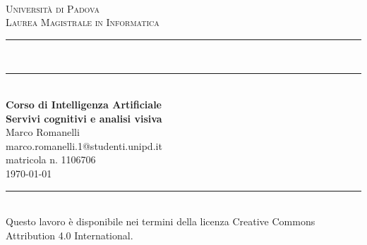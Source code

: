\documentclass[fleqn,a4paper,11pt]{article}
\newcommand\HRule{\rule{\textwidth}{1pt}}
\newcommand\DRule{\rule{\textwidth}{.4pt}\\[\dimexpr-\baselineskip+1mm+2pt] \rule{\textwidth}{2pt}}
\begin{document}
\begin{titlepage}
\begin{center}
	\begin{minipage}{6in}
  		\centering
  		\hspace*{1.6in}
	\end{minipage}\\[1cm]
\textsc{\LARGE Universit\`a di Padova}\\[.2cm]
\textsc{\large Laurea Magistrale in Informatica}\\[.3cm]
\DRule \\[.5cm]
{\Large \bfseries Corso di Intelligenza Artificiale} \\[.4cm]
{\huge \bfseries Servivi cognitivi e analisi visiva} \\[.4cm]
{\Large Marco Romanelli} \\[.2cm]
{\footnotesize marco.romanelli.1@studenti.unipd.it} \\
{\footnotesize matricola n. 1106706} \\[1cm]
{\large \today}
\HRule \\[3cm]
\vspace*{\fill}
{\footnotesize Questo lavoro è disponibile nei termini della licenza Creative Commons Attribution 4.0 International. \cc\by}
\end{center}
\end{titlepage}



\end{document}
